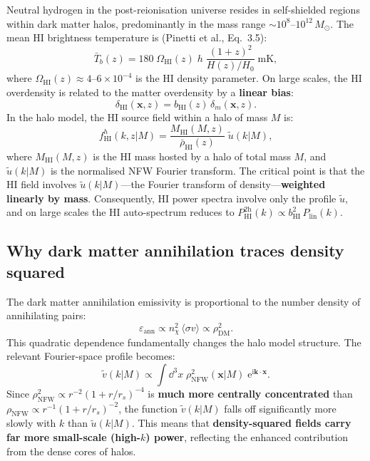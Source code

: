\documentclass[10pt,a4paper]{article}
\newcommand{\vect}[1]{\mathbf{#1}}
\newcommand{\rhobar}{\bar{\rho}}
\newcommand{\Plin}{P_{\mathrm{lin}}}
\newcommand{\utilde}{\tilde{u}}
\newcommand{\vtilde}{\tilde{v}}
\newcommand{\sigv}{\langle\sigma v\rangle}
\newcommand{\Msun}{M_\odot}
\newcommand{\ee}{\mathrm{e}}
\newcommand{\ii}{\mathrm{i}}
\begin{document}
Neutral hydrogen in the post-reionisation universe resides in self-shielded regions within dark matter halos, predominantly in the mass range $\sim 10^8$--$10^{12} \, \Msun$. The mean HI brightness temperature is (Pinetti et al., Eq.~3.5):
\begin{equation}
\label{eq:Tb_mean}
\bar{T}_b(z) = 180 \; \Omega_{\mathrm{HI}}(z) \; h \; \frac{(1 + z)^2}{H(z)/H_0} \; \mathrm{mK},
\end{equation}
where $\Omega_{\mathrm{HI}}(z) \approx 4$--$6 \times 10^{-4}$ is the HI density parameter. On large scales, the HI overdensity is related to the matter overdensity by a \textbf{linear bias}:
\begin{equation}
\delta_{\mathrm{HI}}(\vect{x}, z) = b_{\mathrm{HI}}(z) \, \delta_m(\vect{x}, z).
\end{equation}
In the halo model, the HI source field within a halo of mass $M$ is:
\begin{equation}
f_{\mathrm{HI}}^h(k, z | M) = \frac{M_{\mathrm{HI}}(M, z)}{\rhobar_{\mathrm{HI}}(z)} \; \utilde(k | M),
\end{equation}
where $M_{\mathrm{HI}}(M, z)$ is the HI mass hosted by a halo of total mass $M$, and $\utilde(k | M)$ is the normalised NFW Fourier transform. The critical point is that the HI field involves $\utilde(k | M)$---the Fourier transform of density---\textbf{weighted linearly by mass}. Consequently, HI power spectra involve only the profile $\utilde$, and on large scales the HI auto-spectrum reduces to $P_{\mathrm{HI}}^{\mathrm{2h}}(k) \propto b_{\mathrm{HI}}^2 \, \Plin(k)$.

\subsection{Why dark matter annihilation traces density squared}

The dark matter annihilation emissivity is proportional to the number density of annihilating pairs:
\begin{equation}
\varepsilon_{\mathrm{ann}} \propto n_\chi^2 \, \sigv \propto \rho_{\mathrm{DM}}^2.
\end{equation}
This quadratic dependence fundamentally changes the halo model structure. The relevant Fourier-space profile becomes:
\begin{equation}
\vtilde(k | M) \propto \int \dd^3 x \; \rho_{\mathrm{NFW}}^2(\vect{x} | M) \; \ee^{\ii \vect{k} \cdot \vect{x}}.
\end{equation}
Since $\rho_{\mathrm{NFW}}^2 \propto r^{-2}(1 + r/r_s)^{-4}$ is \textbf{much more centrally concentrated} than $\rho_{\mathrm{NFW}} \propto r^{-1}(1 + r/r_s)^{-2}$, the function $\vtilde(k | M)$ falls off significantly more slowly with $k$ than $\utilde(k | M)$. This means that \textbf{density-squared fields carry far more small-scale (high-$k$) power}, reflecting the enhanced contribution from the dense cores of halos.
\end{document}
